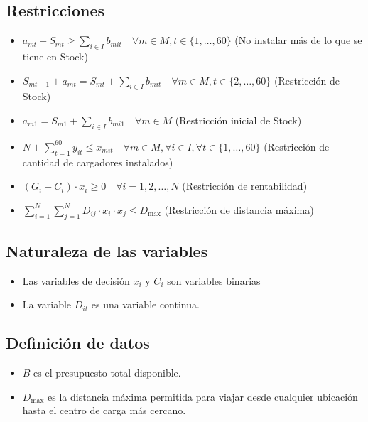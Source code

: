 \documentclass[letterpaper]{article}
\begin{document}
\begin{flushleft}
		\subsection{Restricciones}
		\begin{itemize}
			\item $a_{mt} + S_{mt} \geq \sum_{i \in I} b_{mit} \quad \forall m \in M, t \in \{1, \ldots, 60\}$ (No instalar más de lo que se tiene en Stock)
			\item $S_{mt-1} + a_{mt} = S_{mt} + \sum_{i \in I} b_{mit} \quad \forall m \in M, t \in \{2, \ldots, 60\}$ (Restricción de Stock)
			\item $a_{m1} = S_{m1} + \sum_{i \in I} b_{mi1}  \quad \forall m \in M$ (Restricción inicial de Stock)
			\item $N + \sum_{t=1}^{60} y_{it} \leq x_{mit} \quad \forall m \in M, \forall i \in I, \forall t \in \{1, \ldots, 60\}$ (Restricción de cantidad de cargadores instalados)
			\item $(G_i - C_i) \cdot x_i \geq 0 \quad \forall i=1,2,\ldots,N$ (Restricción de rentabilidad)
			\item $\sum_{i=1}^{N} \sum_{j=1}^{N} D_{ij} \cdot x_i \cdot x_j \leq D_{\text{max}}$ (Restricción de distancia máxima)
		\end{itemize}
		\subsection{Naturaleza de las variables}
		\begin{itemize}
			\item Las variables de decisión $x_i$ y $C_i$ son variables binarias
			\item La variable $D_{it}$ es una variable continua.
		\end{itemize}
		\subsection{Definición de datos}
		\begin{itemize}
			\item $B$ es el presupuesto total disponible.
			\item $D_{\text{max}}$ es la distancia máxima permitida para viajar desde cualquier ubicación hasta el centro de carga más cercano.
		\end{itemize}
		
	\end{flushleft}
	
\end{document}
